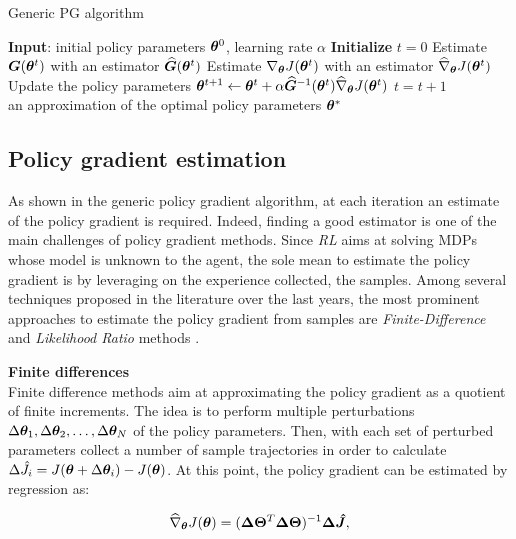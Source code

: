 \begin{algorithm}[t]
	\caption{Generic \gls{PG} algorithm}
	\label{alg:PG}
	\begin{algorithmic}[1]
	\State \textbf{Input}: initial policy parameters $\boldsymbol{\theta}^0$, learning rate $\alpha$
	\State \textbf{Initialize} $t=0$
		\State Estimate $\boldsymbol{G}(\boldsymbol{\theta}^t)$ with an estimator $\widehat{\boldsymbol{G}}(\boldsymbol{\theta}^t)$
		\State Estimate $\nabla_{\boldsymbol{\theta}}J(\boldsymbol{\theta}^t)$ with an estimator $\widehat{\nabla}_{\boldsymbol{\theta}}J(\boldsymbol{\theta}^t)$ \label{step:PGestimation}
		\State Update the policy parameters $\boldsymbol{\theta}^{t+1} \leftarrow \boldsymbol{\theta}^t+\alpha\widehat{\boldsymbol{G}}^{-1}(\boldsymbol{\theta}^t)\widehat{\nabla}_{\boldsymbol{\theta}}J(\boldsymbol{\theta}^t)$
		\State $t=t+1$
	\EndWhile \\
	\Return an approximation of the optimal policy parameters $\boldsymbol{\theta}^*$
	\end{algorithmic}
\end{algorithm}

\subsection{Policy gradient estimation}
As shown in the generic policy gradient algorithm, at each iteration an estimate of the policy gradient is required. Indeed, finding a good estimator is one of the main challenges of policy gradient methods. Since \emph{RL} aims at solving \gls{MDP}s  whose model is unknown to the agent, the sole mean to estimate the policy gradient is by leveraging on the experience collected, \ie the samples. Among several techniques proposed in the literature over the last years, the most prominent approaches to estimate the policy gradient from samples are \emph{Finite-Difference} and \emph{Likelihood Ratio} methods \cite{glynn1990likelihood}.

\textbf{Finite differences}\\
Finite difference methods aim at approximating the policy gradient as a quotient of finite increments. The idea is to perform multiple perturbations $\Delta\boldsymbol{\theta}_1,\Delta\boldsymbol{\theta}_2, \dots, \Delta\boldsymbol{\theta}_N$ of the policy parameters. Then, with each set of perturbed parameters collect a number of sample trajectories in order to calculate $\Delta\hat{J}_i=J(\boldsymbol{\theta}+\Delta\boldsymbol{\theta}_i)-J(\boldsymbol{\theta})$. At this point, the policy gradient can be estimated by regression as:

\begin{align}
\widehat{\nabla}_{\boldsymbol{\theta}}J(\boldsymbol{\theta})=(\boldsymbol{\Delta\Theta}^T\boldsymbol{\Delta\Theta})^{-1}\boldsymbol{\Delta\hat{J}},
\end{align}

